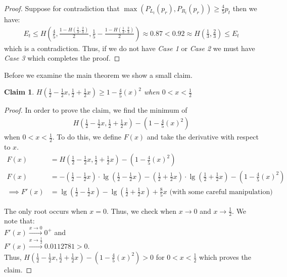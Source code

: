 \documentclass[letterpaper,12pt,titlepage,oneside,final]{book}
\theoremstyle{plain}
\begin{document}
\begin{proof}
Suppose for contradiction that $\max(P_{L_t}(p_r), P_{R_t}(p_r)) \geq \frac{4}{5} p_t$ then we have:
\begin{align*}
E_t \leq H(\frac{4}{5}, \frac{1-H(\frac{1}{3}, \frac{2}{3})}{2}, \frac{1}{5}-\frac{1-H(\frac{1}{3}, \frac{2}{3})}{2}) \approx 0.87 < 0.92 \approx H(\frac{1}{3}, \frac{2}{3}) \leq E_t
\end{align*}
which is a contradiction.
Thus, if we do not have \textit{Case 1} or \textit{Case 2} we must have \textit{Case 3} which completes the proof.



\end{proof}

Before we examine the main theorem we show a small claim.

\newtheorem{claim}{Claim}
\begin{claim}\label{Claim1}
$H(\frac{1}{2}-\frac{1}{2} x, \frac{1}{2} + \frac{1}{2} x) \geq 1- \frac{4}{5} (x)^2$ when $0 < x < \frac{1}{2}$
\end{claim}

\begin{proof}
In order to prove the claim, we find the minimum of
\begin{align*}
H(\frac{1}{2}-\frac{1}{2} x, \frac{1}{2} + \frac{1}{2} x) - (1 - \frac{4}{5} (x)^2) 
\end{align*}
when $0 < x < \frac{1}{2}$. To do this, we define $F(x)$ and take the derivative with respect to $x$.
\begin{align*}
F(x) &= H(\frac{1}{2}-\frac{1}{2} x, \frac{1}{2} + \frac{1}{2} x) - (1 - \frac{4}{5} (x)^2) \\
F(x) &= - (\frac{1}{2}-\frac{1}{2} x)\cdot \lg(\frac{1}{2}-\frac{1}{2} x) - (\frac{1}{2} + \frac{1}{2} x)\cdot\lg(\frac{1}{2} + \frac{1}{2} x) - (1 - \frac{4}{5} (x)^2) \\
\implies F'(x) &= \lg(\frac{1}{2}-\frac{1}{2} x) - \lg(\frac{1}{2} + \frac{1}{2} x) + \frac{8}{5}x \text{ (with some careful manipulation)}
\end{align*}

The only root occurs when $x = 0$. Thus, we check when $x \rightarrow 0$ and $x \rightarrow \frac{1}{2}$. We note that: \\
$F'(x) \xrightarrow{x \to 0} 0^{+}$ and \\
$F'(x) \xrightarrow{x \to \frac{1}{2}} 0.0112781 > 0$. \\
Thus, $H(\frac{1}{2}-\frac{1}{2} x, \frac{1}{2} + \frac{1}{2} x) - (1 - \frac{4}{5} (x)^2) > 0$ for $ 0 < x < \frac{1}{2}$ which proves the claim.
\end{proof} 
\end{document}
